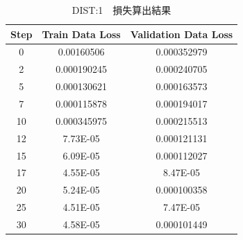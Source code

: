 \documentclass{jreport}		%
\begin{document}
\begin{table}
  \begin{center}
  \caption{DIST:1　損失算出結果}
  \begin{tabular}{c|cc} \hline
Step&Train Data Loss&Validation Data Loss \\ \hline
0&0.00160506&0.000352979 \\
2&0.000190245&0.000240705 \\
5&0.000130621&0.000163573 \\
7&0.000115878&0.000194017 \\
10&0.000345975&0.000215513 \\
12&7.73E-05&0.000121131 \\
15&6.09E-05&0.000112027 \\
17&4.55E-05&8.47E-05 \\
20&5.24E-05&0.000100358 \\
25&4.51E-05&7.47E-05 \\
30&4.58E-05&0.000101449 \\

\end{tabular}
\end{center}
\end{table}
\end{document}
